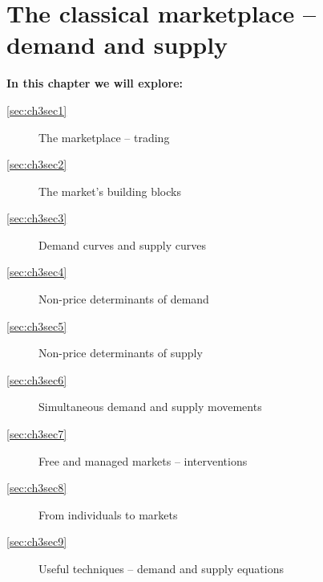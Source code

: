 \chapter{The classical marketplace -- demand and supply}\label{chap:classical}

\begin{topics}
\textbf{In this chapter we will explore:}
\begin{description}
\item[\ref{sec:ch3sec1}] The marketplace -- trading
\item[\ref{sec:ch3sec2}] The market's building blocks
\item[\ref{sec:ch3sec3}] Demand curves and supply curves
\item[\ref{sec:ch3sec4}] Non-price determinants of demand
\item[\ref{sec:ch3sec5}] Non-price determinants of supply
\item[\ref{sec:ch3sec6}] Simultaneous demand and supply movements
\item[\ref{sec:ch3sec7}] Free and managed markets -- interventions
\item[\ref{sec:ch3sec8}] From individuals to markets
\item[\ref{sec:ch3sec9}] Useful techniques -- demand and supply equations
\end{description}
\end{topics}